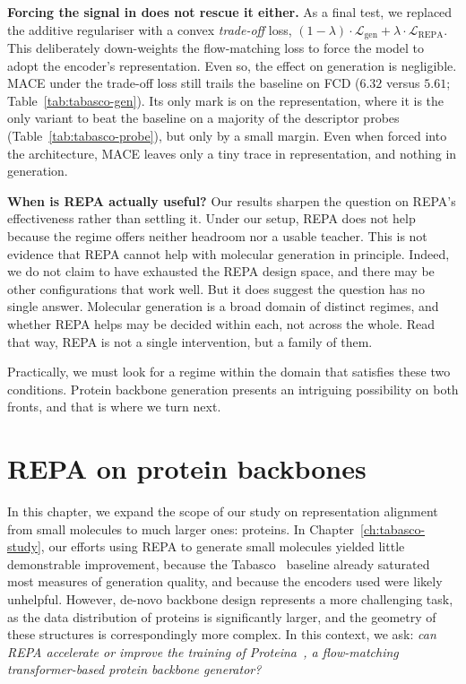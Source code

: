 \documentclass[12pt,a4paper,twoside]{report}
\begin{document}


\textbf{Forcing the signal in does not rescue it either.} As a final test, we replaced the additive regulariser with a convex \emph{trade-off} loss, $(1-\lambda)\cdot\mathcal{L}_{\text{gen}} + \lambda\cdot\mathcal{L}_{\text{REPA}}$. This deliberately down-weights the flow-matching loss to force the model to adopt the encoder's representation. Even so, the effect on generation is negligible. MACE under the trade-off loss still trails the baseline on FCD ($6.32$ versus $5.61$; Table~\ref{tab:tabasco-gen}). Its only mark is on the representation, where it is the only variant to beat the baseline on a majority of the descriptor probes (Table~\ref{tab:tabasco-probe}), but only by a small margin. Even when forced into the architecture, MACE leaves only a tiny trace in representation, and nothing in generation.

\textbf{When is REPA actually useful?} Our results sharpen the question on REPA's effectiveness rather than settling it. Under our setup, REPA does not help because the regime offers neither headroom nor a usable teacher. This is not evidence that REPA cannot help with molecular generation in principle. Indeed, we do not claim to have exhausted the REPA design space, and there may be other configurations that work well. But it does suggest the question has no single answer. Molecular generation is a broad domain of distinct regimes, and whether REPA helps may be decided within each, not across the whole. Read that way, REPA is not a single intervention, but a family of them.

Practically, we must look for a regime within the domain that satisfies these two conditions. Protein backbone generation presents an intriguing possibility on both fronts, and that is where we turn next.

\chapter{REPA on protein backbones}
\label{ch:proteina-study}


In this chapter, we expand the scope of our study on representation alignment from small molecules to much larger ones: proteins. In Chapter~\ref{ch:tabasco-study}, our efforts using REPA to generate small molecules yielded little demonstrable improvement, because the Tabasco~\cite{Tabasco} baseline already saturated most measures of generation quality, and because the encoders used were likely unhelpful. However, de-novo backbone design represents a more challenging task, as the data distribution of proteins is significantly larger, and the geometry of these structures is correspondingly more complex. In this context, we ask: \emph{can REPA accelerate or improve the training of Proteina~\cite{Proteina}, a flow-matching transformer-based protein backbone generator?}
\end{document}
